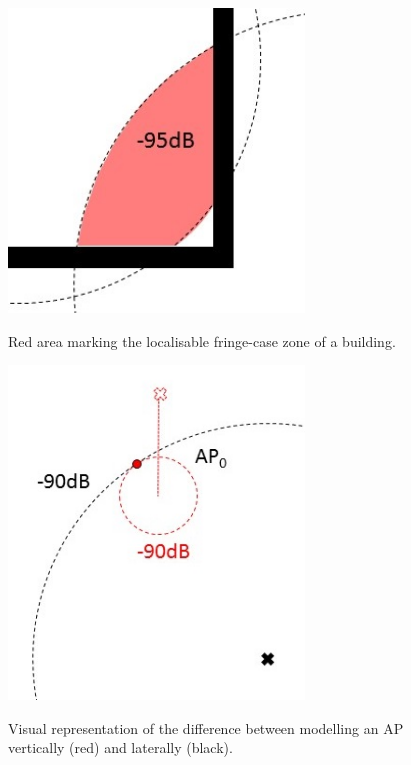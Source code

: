 \documentclass{UoYCSproject}
\begin{document}
                \begin{figure}[h]
                	\centering
                	\begin{minipage}{0.45\textwidth}
                		\centering
                        \label{fig:fringe}
                		\includegraphics[width=0.7\textwidth]{fringe.jpg}
                		\caption{Red area marking the localisable fringe-case zone of a building.}
                	\end{minipage}\hfill
                	\begin{minipage}{0.45\textwidth}
                		\centering
                        \label{fig:vertical}
                		\includegraphics[width=0.7\textwidth]{vertical.jpg}
                		\caption{Visual representation of the difference between modelling an AP vertically (red) and laterally (black).}
                	\end{minipage}
                \end{figure}
                
\end{document}
